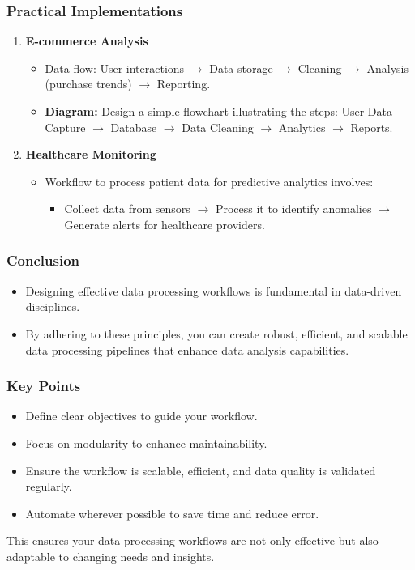 \documentclass[aspectratio=169]{beamer}
\begin{document}
\begin{frame}
    \frametitle{Practical Implementations}
    \begin{enumerate}
        \item \textbf{E-commerce Analysis}
        \begin{itemize}
            \item Data flow: User interactions $\rightarrow$ Data storage $\rightarrow$ Cleaning $\rightarrow$ Analysis (purchase trends) $\rightarrow$ Reporting.
            \item \textbf{Diagram:} Design a simple flowchart illustrating the steps: User Data Capture $\rightarrow$ Database $\rightarrow$ Data Cleaning $\rightarrow$ Analytics $\rightarrow$ Reports.
        \end{itemize}

        \item \textbf{Healthcare Monitoring}
        \begin{itemize}
            \item Workflow to process patient data for predictive analytics involves:
            \begin{itemize}
                \item Collect data from sensors $\rightarrow$ Process it to identify anomalies $\rightarrow$ Generate alerts for healthcare providers.
            \end{itemize}
        \end{itemize}
    \end{enumerate}
\end{frame}

\begin{frame}
    \frametitle{Conclusion}
    \begin{itemize}
        \item Designing effective data processing workflows is fundamental in data-driven disciplines.
        \item By adhering to these principles, you can create robust, efficient, and scalable data processing pipelines that enhance data analysis capabilities.
    \end{itemize}
\end{frame}

\begin{frame}
    \frametitle{Key Points}
    \begin{itemize}
        \item Define clear objectives to guide your workflow.
        \item Focus on modularity to enhance maintainability.
        \item Ensure the workflow is scalable, efficient, and data quality is validated regularly.
        \item Automate wherever possible to save time and reduce error.
    \end{itemize}
    This ensures your data processing workflows are not only effective but also adaptable to changing needs and insights.
\end{frame}
\end{document}

